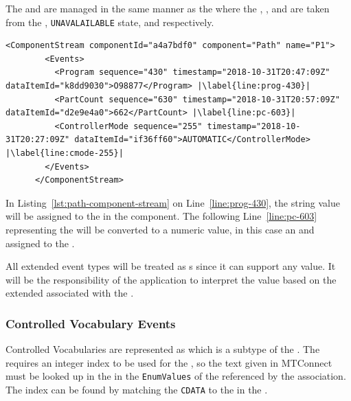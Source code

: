 The  and   are managed in the same manner as the  where the , , and  are taken from the , \texttt{UNAVALAILABLE} state, and  respectively.

\begin{lstlisting}[firstnumber=last,escapechar=|,%
    caption={Path Component Stream},label={lst:path-component-stream}]
      <ComponentStream componentId="a4a7bdf0" component="Path" name="P1">
        <Events>
          <Program sequence="430" timestamp="2018-10-31T20:47:09Z" dataItemId="k8dd9030">O98877</Program> |\label{line:prog-430}|
          <PartCount sequence="630" timestamp="2018-10-31T20:57:09Z" dataItemId="d2e9e4a0">662</PartCount> |\label{line:pc-603}|
          <ControllerMode sequence="255" timestamp="2018-10-31T20:27:09Z" dataItemId="if36ff60">AUTOMATIC</ControllerMode> |\label{line:cmode-255}|
        </Events>
      </ComponentStream>
\end{lstlisting}

In Listing~\ref{lst:path-component-stream} on Line~\ref{line:prog-430}, the string value will be assigned to the   in the  component. The following Line~\ref{line:pc-603} representing the  will be converted to a numeric value, in this case an  and assigned to the .

All extended event types will be treated as s since it can support any value. It will be the responsibility of the application to interpret the value based on the extended  associated with the .

\subsubsection{Controlled Vocabulary Events}

Controlled Vocabularies are represented as  which is a subtype of the . The  requires an integer index to be used for the , so the text given in MTConnect must be looked up in the  in the \texttt{EnumValues}  of the  referenced by the  association. The index can be found by matching the \texttt{CDATA} to the  in the .

